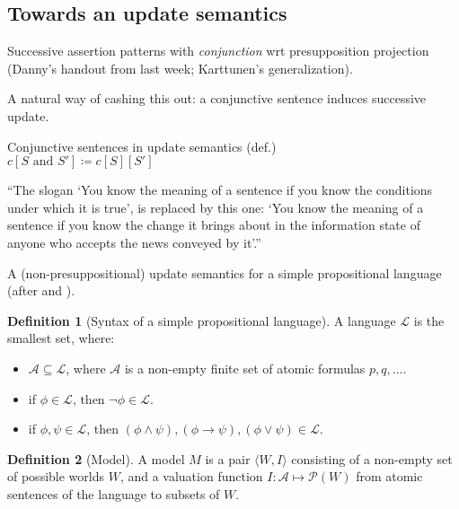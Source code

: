 \documentclass[nols,twoside,nofonts,nobib,nohyper]{tufte-handout}
\theoremstyle{definition}
\newtheorem{definition}{Definition}[section]
\begin{document}
\subsection{Towards an update semantics}

Successive assertion patterns with \textit{conjunction} wrt presupposition projection (Danny's handout from last week; Karttunen's generalization).

A natural way of cashing this out: a conjunctive sentence induces successive update.

\ex Conjunctive sentences in update semantics (def.)\\
$c[S\text{ and }S'] ≔ c[S][S']$
\xe

\begin{displayquote}
\enquote{The slogan `You know the meaning of a sentence if you know the conditions under which it is true', is replaced by this one: `You know the meaning of a sentence if you know the change it brings about in the information state of anyone who accepts the news conveyed by it'.}
\end{displayquote}

A (non-presuppositional) update semantics for a simple propositional language (after \citealt{Veltman1996} and \citealt{Heim1983}).

\begin{definition}[Syntax of a simple propositional language]
  A language $\mathscr{L}$ is the smallest set, where:
  \begin{itemize}
      \item $\mathscr{A} ⊆ \mathscr{L}$, where $\mathscr{A}$ is a non-empty finite set of atomic formulas $p,q,…$.
      \item if $ϕ ∈ \mathscr{L}$, then $¬ ϕ ∈ \mathscr{L}$.
      \item if $ϕ,ψ ∈ \mathscr{L}$, then $(ϕ ∧ ψ), (ϕ → ψ), (ϕ ∨ ψ) ∈ \mathscr{L}$.
  \end{itemize}
\end{definition}


\begin{definition}[Model]
A model $M$ is a pair $⟨W,I⟩$ consisting of a non-empty set of possible worlds $W$, and a valuation function $I:\mathscr{A} ↦ \mathscr{P}(W)$ from atomic sentences of the language to subsets of $W$.
\end{definition}
\end{document}
